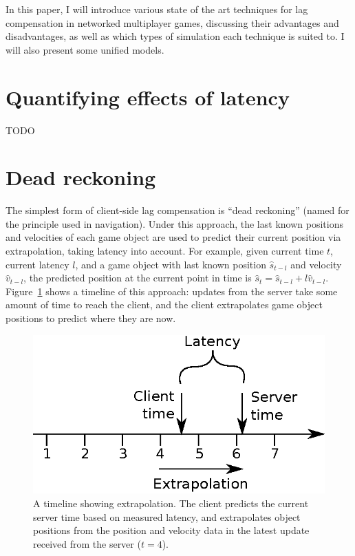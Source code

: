 \documentclass[conference]{IEEEtran}
\begin{document}
	In this paper, I will introduce various state of the art techniques for lag compensation in networked multiplayer games, discussing their advantages and disadvantages, as well as which types of simulation each technique is suited to. I will also present some unified models.

	\section{Quantifying effects of latency}

	TODO \cite{beigbeder2004effects} \cite{chen2011perceptual} \cite{claypool2005effect} \cite{fritsch2005effect} \cite{sheldon2003effect} \cite{quax2004objective} \cite{dick2005analysis}

	\section{Dead reckoning}

	The simplest form of client-side lag compensation is ``dead reckoning'' (named for the principle used in navigation). Under this approach, the last known positions and velocities of each game object are used to predict their current position via extrapolation, taking latency into account. For example, given current time $t$, current latency $l$, and a game object with last known position $\hat{s}_{t - l}$ and velocity $\hat{v}_{t - l}$, the predicted position at the current point in time is $\hat{s}_{t} = \hat{s}_{t - l} + l\hat{v}_{t - l}$. Figure~\ref{fig:extrapolation_timeline} shows a timeline of this approach: updates from the server take some amount of time to reach the client, and the client extrapolates game object positions to predict where they are now.

	\begin{figure}
		\centering\includegraphics[width=\linewidth]{figures/extrapolation_timeline.eps}
		\caption{A timeline showing extrapolation. The client predicts the current server time based on measured latency, and extrapolates object positions from the position and velocity data in the latest update received from the server ($t = 4$).}
		\label{fig:extrapolation_timeline}
	\end{figure}
\end{document}
